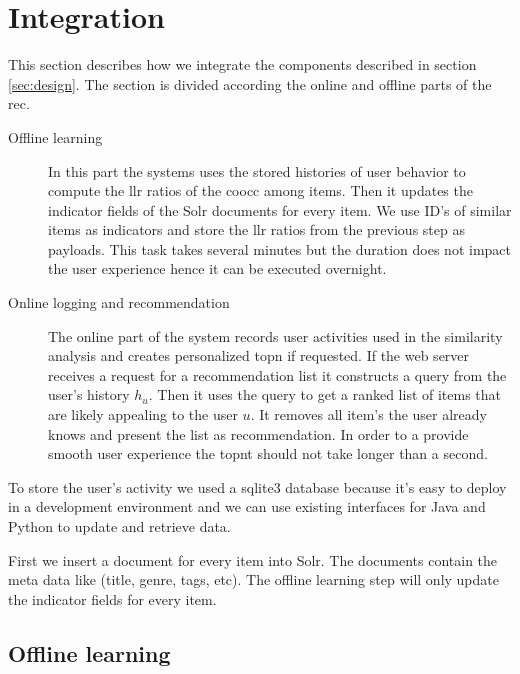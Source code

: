 \section{Integration}
\label{sec:integration}

This section describes how we integrate the components described in section \ref{sec:design}. The section is divided according the online and offline parts of the \gls{rec}.

\begin{description}
\item[Offline learning] In this part the systems uses the stored histories of user behavior to compute the \gls{llr} ratios of the \gls{coocc} among items. Then it updates the indicator fields of the Solr documents for every item. We use ID's of similar items as indicators and store the \gls{llr} ratios from the previous step as payloads. This task takes several minutes but the duration does not impact the user experience hence it can be executed overnight. 
\item[Online logging and recommendation] The online part of the system records user activities used in the similarity analysis and creates personalized \gls{topn} if requested. If the web server receives a request for a recommendation list it constructs a query from the user's history $h_u$. Then it uses the query to get a ranked list of items that are likely appealing to the user $u$. It removes all item's the user already knows and present the list as recommendation. In order to a  provide smooth user experience the \gls{topnt} should not take longer than a second.
\end{description}

To store the user's activity we used a sqlite3 database because it's easy to deploy in a development environment and we can use existing interfaces for Java and Python to update and retrieve data. 

First we insert a document for every item into Solr. The documents contain the meta data like (title, genre, tags, etc). The offline learning step will only update the indicator fields for every item.

\subsection{Offline learning}
\label{sec:offline}

